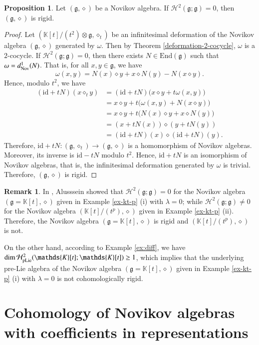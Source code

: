 \documentclass[12pt]{amsart}
\theoremstyle{definition}
\newtheorem{pro}[thm]{Proposition}
\newtheorem{rmk}[thm]{Remark}
\newcommand{\g}{\mathfrak g}
\newcommand{\huaH}{\mathcal{H}}
\newcommand{\id}{\mathrm{id}}
\newcommand{\End}{\mathrm{End}}
\newcommand{\ot}{\otimes}
\newcommand{\nov}{{\rm Nov}}
\newcommand{\ome}{\omega}
\newcommand{\pl}{{\rm pLie}}
\begin{document}
\begin{pro}
Let $(\g,\diamond)$ be a Novikov algebra. If $\huaH^2(\g;\g)=0$, then $(\g,\diamond)$ is rigid.
\end{pro}
\begin{proof}
	Let
$(\mathds{K}[t]/(t^2)\ot\g, \diamond_t)$ be an infinitesimal deformation of the Novikov algebra $(\g,\diamond)$ generated by $\ome$. Then by Theorem \ref{deformation-2-cocycle}, $\omega$ is a $2$-cocycle. If $\huaH^2(\g;\g)=0$, then there exists $N\in\End(\g)$ such that $\ome=d_\nov^1(N)$.
That is, for all $x,y\in\g$, we have
$$
	\ome(x,y)=N(x)\diamond y+x\diamond N(y)-N(x\diamond y).
$$
Hence, modulo $t^2$, we have
	\begin{align*}
		(\id+tN)(x\diamond_t y)
		&=(\id+tN)\bigl(x\diamond y+t\ome(x,y)\bigr)\\
		&=x\diamond y+t\bigl(\ome(x,y)+N(x\diamond y)\bigr)\\
		&=x\diamond y+t\bigl(N(x)\diamond y+x\diamond N(y)\bigr)\\
		&=(x+tN(x))\diamond(y+tN(y))\\
		&=(\id+tN)(x)\diamond(\id+tN)(y).
	\end{align*}
Therefore, $\id+tN:(\g,\diamond_t)\to(\g,\diamond)$ is a homomorphism of Novikov algebras. Moreover, its inverse is $\id-tN$ modulo $t^2$. Hence, $\id+tN$ is an isomorphism of Novikov algebras, that is, the infinitesimal deformation generated by $\omega$ is trivial. Therefore, $(\g,\diamond)$ is rigid.
\end{proof}

\begin{rmk}\label{rmk-Alussein}
In \cite{Alussein}, Alusssein showed that
   $\huaH^2(\g;\g)=0$ for the Novikov algebra $(\g=\mathds{K}[t],\diamond)$ given in Example \ref{ex-kt-p} (i) with $\lambda =0$;   while $\huaH^2(\g;\g)\neq 0$ for the Novikov algebra $(\mathds{K}[t]/(t^p),\diamond)$ given in Example \ref{ex-kt-p} (ii). Therefore, the Novikov algebra $(\g=\mathds{K}[t],\diamond)$ is rigid and  $(\mathds{K}[t]/(t^p),\diamond)$ is not.

   On the other hand, according to Example \ref{ex:diff}, we have
  $\dim\huaH^2_\pl(\mathds{K}[t];\mathds{K}[t])\geq 1$, which implies that the underlying pre-Lie algebra of the Novikov algebra $(\g=\mathds{K}[t],\diamond)$ given in Example \ref{ex-kt-p} (i) with $\lambda =0$ is not cohomologically rigid.
\end{rmk}

\section{Cohomology of Novikov algebras with coefficients in representations}\label{sec:rep}
\end{document}
